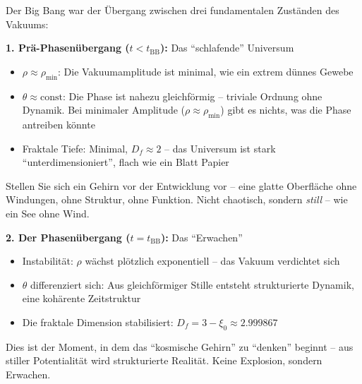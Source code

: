 Der Big Bang war der Übergang zwischen drei fundamentalen Zuständen des Vakuums:

\textbf{1. Prä-Phasenübergang ($t < t_{\text{BB}}$):} Das \enquote{schlafende} Universum

\begin{itemize}[leftmargin=*]
\item $\rho \approx \rho_{\min}$: Die Vakuumamplitude ist minimal, wie ein extrem dünnes Gewebe
\item $\theta \approx \text{const}$: Die Phase ist nahezu gleichförmig -- triviale Ordnung ohne Dynamik. Bei minimaler Amplitude ($\rho \approx \rho_{\min}$) gibt es nichts, was die Phase antreiben könnte
\item Fraktale Tiefe: Minimal, $D_f \approx 2$ -- das Universum ist stark \enquote{unterdimensioniert}, flach wie ein Blatt Papier
\end{itemize}

Stellen Sie sich ein Gehirn vor der Entwicklung vor -- eine glatte Oberfläche ohne Windungen, ohne Struktur, ohne Funktion. Nicht chaotisch, sondern \textit{still} -- wie ein See ohne Wind.

\textbf{2. Der Phasenübergang ($t = t_{\text{BB}}$):} Das \enquote{Erwachen}

\begin{itemize}[leftmargin=*]
\item Instabilität: $\rho$ wächst plötzlich exponentiell -- das Vakuum verdichtet sich
\item $\theta$ differenziert sich: Aus gleichförmiger Stille entsteht strukturierte Dynamik, eine kohärente Zeitstruktur
\item Die fraktale Dimension stabilisiert: $D_f = 3 - \xi_0 \approx 2.999867$
\end{itemize}

Dies ist der Moment, in dem das \enquote{kosmische Gehirn} zu \enquote{denken} beginnt -- aus stiller Potentialität wird strukturierte Realität. Keine Explosion, sondern Erwachen.

